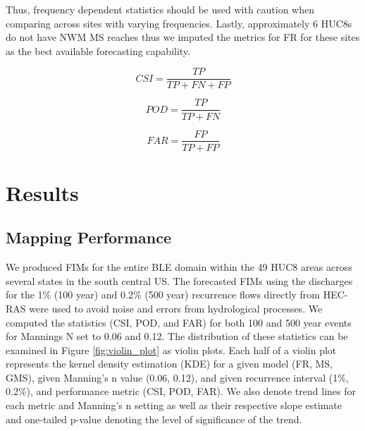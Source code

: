 \documentclass[draft]{dependencies/agujournal2019}
\begin{document}
Thus, frequency dependent statistics should be used with caution when comparing across sites with varying frequencies. 
Lastly, approximately 6 HUC8s do not have NWM MS reaches thus we imputed the metrics for FR for these sites as the best available forecasting capability.
%
\begin{linenomath*}
\begin{equation}
\label{eq:csi}
CSI = \frac{TP}{TP + FN + FP}
\end{equation}
\end{linenomath*}
%
\begin{linenomath*}
\begin{equation}
\label{eq:pod}
POD = \frac{TP}{TP + FN}
\end{equation}
\end{linenomath*}
%
\begin{linenomath*}
\begin{equation}
\label{eq:far}
FAR = \frac{FP}{TP + FP}
\end{equation}
\end{linenomath*}
%
\clearpage %
\section{Results}
\label{sec:results}
%
\subsection{Mapping Performance}
\label{ssec:mapping_performance}
%
We produced FIMs for the entire BLE domain within the 49 HUC8 areas across several states in the south central US. 
The forecasted FIMs using the discharges for the 1\% (100 year) and 0.2\% (500 year) recurrence flows directly from HEC-RAS were used to avoid noise and errors from hydrological processes.
We computed the statistics (CSI, POD, and FAR) for both 100 and 500 year events for Mannings N set to 0.06 and 0.12. 
The distribution of these statistics can be examined in Figure \ref{fig:violin_plot} as violin plots.
Each half of a violin plot represents the kernel density estimation (KDE) for a given model (FR, MS, GMS), given Manning's n value (0.06, 0.12), and given recurrence interval (1\%, 0.2\%), and performance metric (CSI, POD, FAR).
We also denote trend lines for each metric and Manning's n setting as well as their respective slope estimate and one-tailed p-value denoting the level of significance of the trend.
\end{document}
